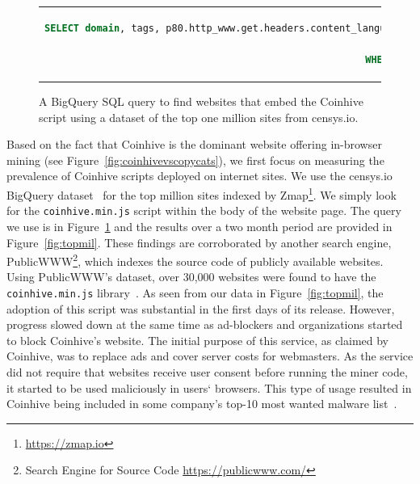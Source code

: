 \begin{figure}[t]
\begin{tabular}{c}
\begin{lstlisting}[language=sql]
SELECT domain, tags, p80.http_www.get.headers.content_language, p80.http_www.get.headers.server, p80.http.get.headers.x_powered_by, p80.http.get.title, p80.http_www.get.body as wwwbody, p80.http.get.body as plainbody 
FROM censys-io.domain_public.20171123
WHERE STRPOS(p80.http.get.body, coinhive.min.js) > 0 or STRPOS(p80.http_www.get.body, coinhive.min.js) >0)
\end{lstlisting}
\end{tabular}
\caption{A BigQuery SQL query to find websites that embed the Coinhive script using a dataset of the top one million sites from censys.io. \label{lst:bigquery}}
\end{figure}


Based on the fact that Coinhive is the dominant website offering in-browser mining  (see Figure~\ref{fig:coinhivevscopycats}), we first focus on measuring the prevalence of Coinhive scripts deployed on internet sites. We use the censys.io BigQuery dataset~\cite{censys15} for the top million sites indexed by Zmap\footnote{\url{https://zmap.io}}. We simply look for the \texttt{coinhive.min.js} script within the body of the website page. The query we use is in Figure~\ref{lst:bigquery} and the results over a two month period are provided in Figure~\ref{fig:topmil}. These findings are corroborated by another search engine, PublicWWW\footnote{Search Engine for Source Code \url{https://publicwww.com/}}, which indexes the source code of publicly available websites. Using PublicWWW's dataset, over 30,000 websites were found to have the \texttt{coinhive.min.js} library~\cite{badpacketspublicwww}. As seen from our data in Figure~\ref{fig:topmil}, the adoption of this script was substantial in the first days of its release. However, progress slowed down at the same time as ad-blockers and organizations started to block Coinhive's website. The initial purpose of this service, as claimed by Coinhive, was to replace ads and cover server costs for webmasters. As the service did not require that websites receive user consent before running the miner code, it started to be used maliciously in users` browsers. This type of usage resulted in Coinhive being included in some company's top-10 most wanted malware list~\cite{checkpoint}.


